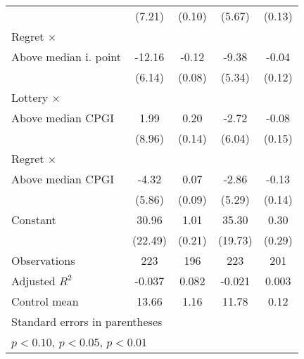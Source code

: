 \begin{table}[htbp]
\begin{tabular}{l*{4}{c}}
                &   (7.21)         &   (0.10)         &   (5.67)         &   (0.13)         \\
\addlinespace
Regret $\times$ \\ Above median i. point&   -12.16\sym{**} &    -0.12         &    -9.38\sym{*}  &    -0.04         \\
                &   (6.14)         &   (0.08)         &   (5.34)         &   (0.12)         \\
\addlinespace
Lottery $\times$ \\ Above median CPGI&     1.99         &     0.20         &    -2.72         &    -0.08         \\
                &   (8.96)         &   (0.14)         &   (6.04)         &   (0.15)         \\
\addlinespace
Regret $\times$ \\ Above median CPGI&    -4.32         &     0.07         &    -2.86         &    -0.13         \\
                &   (5.86)         &   (0.09)         &   (5.29)         &   (0.14)         \\
\addlinespace
Constant        &    30.96         &     1.01\sym{***}&    35.30\sym{*}  &     0.30         \\
                &  (22.49)         &   (0.21)         &  (19.73)         &   (0.29)         \\
\midrule
Observations    &      223         &      196         &      223         &      201         \\
Adjusted \(R^{2}\)&   -0.037         &    0.082         &   -0.021         &    0.003         \\
Control mean    &    13.66         &     1.16         &    11.78         &     0.12         \\
\bottomrule
\multicolumn{5}{l}{\footnotesize Standard errors in parentheses}\\
\multicolumn{5}{l}{\footnotesize \sym{*} \(p<0.10\), \sym{**} \(p<0.05\), \sym{***} \(p<0.01\)}\\
\end{tabular}
\end{table}

